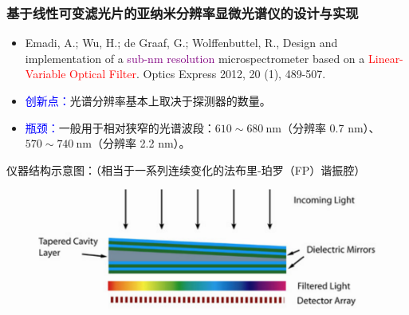 \begin{frame}[c]
    \frametitle{基于线性可变滤光片的亚纳米分辨率显微光谱仪的设计与实现}
    \begin{itemize}
        \item Emadi, A.;  Wu, H.;  de Graaf, G.; Wolffenbuttel, R., Design and implementation of a \textcolor{purple}{sub-nm resolution} microspectrometer based on a  \textcolor{red}{Linear-Variable Optical Filter}. Optics Express 2012, 20 (1), 489-507.
        \item \textcolor{blue}{创新点：}光谱分辨率基本上取决于探测器的数量。
        \item \textcolor{blue}{瓶颈：}一般用于相对狭窄的光谱波段：$610\sim 680\ \mathrm{nm}$（分辨率 0.7 nm）、$570\sim 740\ \mathrm{nm}$（分辨率 2.2 nm）。
    \end{itemize}
    仪器结构示意图：（相当于一系列连续变化的法布里-珀罗（FP）谐振腔）
    \begin{figure}[H] %
        \centering %
        \includegraphics[width=1.\textwidth]{figures/Design and implementation of a sub-nm resolution microspectrometer based on a Linear-Variable Optical Filter_1.png} %
    \end{figure}
\end{frame}

